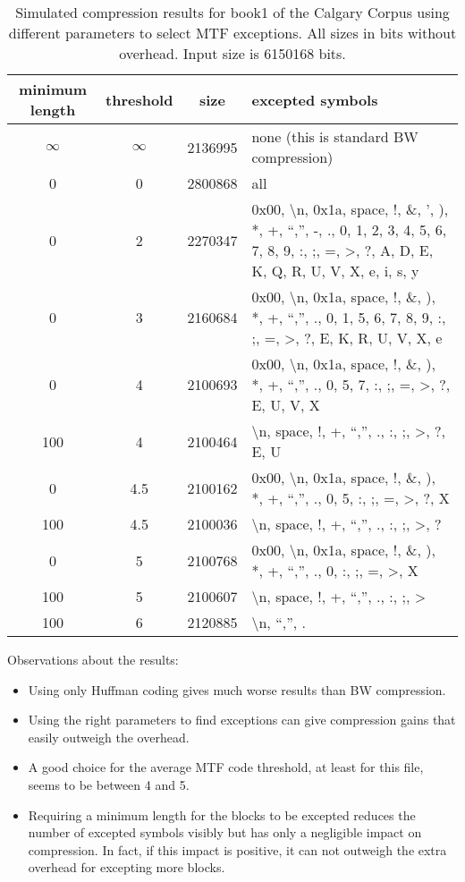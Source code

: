 \documentclass[a4paper]{scrreprt}
\begin{document}
\begin{table}
\centering
\begin{tabularx}{\textwidth}{c|c|c|X}
minimum length & threshold & size & excepted symbols \\ \hline
\(\infty\) & \(\infty\) & 2136995 & none (this is standard BW compression) \\
0 & 0 & 2800868 & all \\
0 & 2 & 2270347 & 0x00, \textbackslash n, 0x1a, space, !, \&, ', ), *, +, ``,'',
-, ., 0, 1, 2, 3, 4, 5, 6, 7, 8, 9, :, ;, =, >, ?, A, D, E, K, Q, R, U, V, X, e,
i, s, y \\
0 & 3 & 2160684 & 0x00, \textbackslash n, 0x1a, space, !, \&, ), *, +,
``,'', ., 0, 1, 5, 6, 7, 8, 9, :, ;, =, >, ?, E, K, R, U, V, X, e \\
0 & 4 & 2100693 & 0x00, \textbackslash n, 0x1a, space, !, \&, ), *, +, ``,'', .,
0, 5, 7, :, ;, =, >, ?, E, U, V, X \\
100 & 4 & 2100464 & \textbackslash n, space, !, +, ``,'', ., :, ;, >, ?, E, U \\
0 & 4.5 & 2100162 & 0x00, \textbackslash n, 0x1a, space, !, \&, ), *, +, ``,'',
., 0, 5, :, ;, =, >, ?, X \\
100 & 4.5 & 2100036 & \textbackslash n, space, !, +, ``,'', ., :, ;, >, ? \\
0 & 5 & 2100768 & 0x00, \textbackslash n, 0x1a, space, !, \&, ), *, +,
``,'', ., 0, :, ;, =, >, X \\
100 & 5 & 2100607 & \textbackslash n, space, !, +, ``,'', ., :, ;, > \\
100 & 6 & 2120885 & \textbackslash n, ``,'', . \\
\end{tabularx}
\label{tab:resmtfexc}
\caption{Simulated compression results for book1 of the Calgary Corpus using
different parameters to select MTF exceptions. All sizes in bits without
overhead. Input size is 6150168 bits.}
\end{table}

Observations about the results:

\begin{itemize}
  \item Using only Huffman coding gives much worse results than BW compression.
  \item Using the right parameters to find exceptions can give compression gains
  that easily outweigh the overhead.
  \item A good choice for the average MTF code threshold, at least for this
  file, seems to be between 4 and 5.
  \item Requiring a minimum length for the blocks to be excepted reduces the
  number of excepted symbols visibly but has only a negligible impact on
  compression. In fact, if this impact is positive, it can not outweigh the
  extra overhead for excepting more blocks.
\end{itemize}
\end{document}
